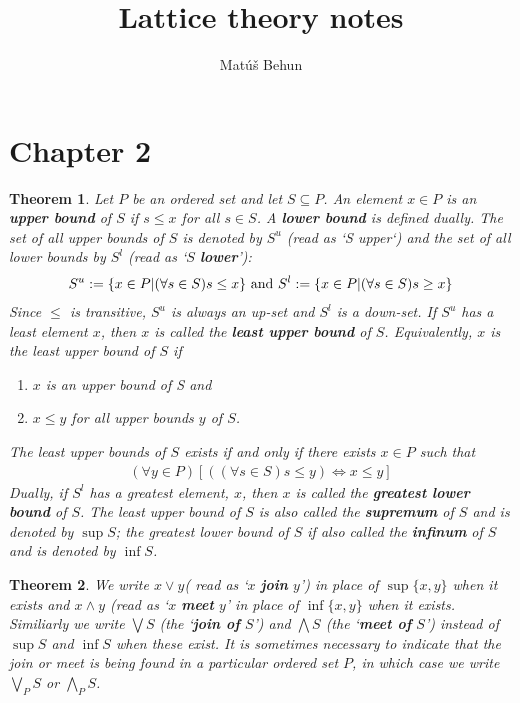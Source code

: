 \documentclass[a4paper,12pt,oneside]{report}%
\author{Mat\'u\v{s} Behun}
\title{Lattice theory notes}
\newtheorem{theorem}{Theorem}
\begin{document}
\section{Chapter 2}

\begin{theorem}
Let $P$ be an ordered set and let $S \subseteq P$.
An element $x \in P$ is an \textbf{upper bound} of $S$ if $s \leq x$ for all
    $s \in S$.
A \textbf{lower bound} is defined dually.
The set of all upper bounds of $S$ is denoted by $S^{u}$ (read as `S upper`) and
    the set of all lower bounds by $S^{l}$ (read as `$S$ \textbf{lower}'):
    \begin{align*}
        S^{u} := \lbrace x \in P | ( \forall s \in S) s \leq x \rbrace
        \textnormal{ and }
        S^{l} := \lbrace x \in P | ( \forall s \in S) s \geq x \rbrace
    \end{align*}
Since $\leq$ is transitive, $S^{u}$ is always an up-set and $S^{l}$ is a
    down-set. If $S^{u}$ has a least element $x$, then $x$ is called the 
    \textbf{least upper bound} of $S$.
Equivalently, $x$ is the least upper bound of $S$ if
    \begin{enumerate}
        \item $x$ is an upper bound of S and
        \item $x \leq y$ for all upper bounds $y$ of $S$.
    \end{enumerate}
The least upper bounds of $S$ exists if and only if there exists $x \in P$ such
    that
    \begin{align*}
        ( \forall y \in P)[ ( ( \forall s \in S) s \leq y) \Longleftrightarrow x \leq y ]
    \end{align*}
Dually, if $S^{l}$ has a greatest element, $x$, then $x$ is called the 
    \textbf{greatest lower bound} of $S$.
The least upper bound of $S$ is also called the \textbf{supremum} of $S$ and is
    denoted by $\sup S$; the greatest lower bound of $S$ if also called the
    \textbf{infinum} of $S$ and is denoted by $\inf S$.
\end{theorem}

\begin{theorem}
We write $x \vee y$( read as `$x$ \textbf{join} $y$') in place of
    $\sup \lbrace x, y \rbrace$ when it exists and $x \wedge y$ (read as
    `$x$ \textbf{meet} $y$' in place of $\inf \lbrace x, y \rbrace$ when it
    exists.
    Similiarly we write $\bigvee S$ (the `\textbf{join of} $S$') and
    $\bigwedge S$ (the `\textbf{meet of} $S$') instead of $\sup S$ and
    $\inf S$ when these exist.
It is sometimes necessary to indicate that the join or meet is being found in a
    particular ordered set $P$, in which case we write $\bigvee_{P} S$ or
    $\bigwedge_{P} S$.
\end{theorem}
\end{document}
